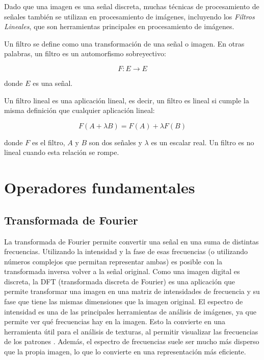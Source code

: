 Dado que una imagen es una señal discreta, muchas técnicas de procesamiento de señales también se utilizan en procesamiento de imágenes, incluyendo los \textit{Filtros Lineales}, que son herramientas principales en procesamiento de imágenes.

Un filtro se define como una transformación de una señal o imagen. En otras palabras, un filtro es un automorfismo sobreyectivo:

\begin{equation}
F : E \rightarrow E 
\end{equation}

donde $E$ es una señal.

Un filtro lineal es una aplicación lineal, es decir, un filtro es lineal si cumple la misma definición que cualquier aplicación lineal:

\begin{equation}
F(A + \lambda B) = F(A) + \lambda F(B) 
\end{equation}

donde $F$ es el filtro, $A$ y $B$ son dos señales y $\lambda$ es un escalar real. Un filtro es no lineal cuando esta relación se rompe.

\section{Operadores fundamentales}
\subsection{Transformada de Fourier}
La transformada de Fourier permite convertir una señal en una suma de distintas frecuencias. Utilizando la intensidad y la fase de esas frecuencias (o utilizando números complejos que permitan representar ambas) es posible con la transformada inversa volver a la señal original. Como una imagen digital es discreta, la DFT (transformada discreta de Fourier) es una aplicación que permite transformar una imagen en una matriz de intensidades de frecuencia y su fase que tiene las mismas dimensiones que la imagen original. El espectro de intensidad es una de las principales herramientas de análisis de imágenes, ya que permite ver qué frecuencias hay en la imagen. Esto la convierte en una herramienta útil para el análisis de texturas, al permitir visualizar las frecuencias de los patrones \parencite{azencott1997texture}. Además, el espectro de frecuencias suele ser mucho más disperso que la propia imagen, lo que lo convierte en una representación más eficiente.

